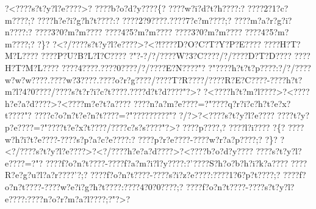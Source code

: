 \documentclass[11pt, openany]{book}
\begin{document}
{{{{{{{{{{{{{{{{{{{{{{{{{{{{{{{{{{{{{{{{{{{{{{{{{{{{{{{{{{{{{{{{{{{{{{{{{{{{{{{{{{{{{{{{{{{{{{{{{{{{{{{{{{{{{?\textless{}???\textbar{}?s?t?y?l?e???\textbar{}?\textgreater{}?
???\textbar{}?b?o?d?y???\textbar{}?\{?
???\textbar{}?w?i?d?t?h???\textbar{}?:?
???\textbar{}?2?1?c?m???\textbar{}?;?
???\textbar{}?h?e?i?g?h?t???\textbar{}?:?
???\textbar{}?2?9???\textbar{}?.???\textbar{}?7?c?m???\textbar{}?;?
???\textbar{}?m?a?r?g?i?n???\textbar{}?:?
???\textbar{}?3?0?m?m???\textbar{}? ???\textbar{}?4?5?m?m???\textbar{}?
???\textbar{}?3?0?m?m???\textbar{}?
???\textbar{}?4?5?m?m???\textbar{}?;? ?\}?
?\textless{}?/???\textbar{}?s?t?y?l?e???\textbar{}?\textgreater{}?\textless{}?!???\textbar{}?D?O?C?T?Y?P?E???\textbar{}?
???\textbar{}?H?T?M?L???\textbar{}?
???\textbar{}?P?U?B?L?I?C???\textbar{}?
?"?-?/?/???\textbar{}?W?3?C???\textbar{}?/?/???\textbar{}?D?T?D???\textbar{}?
???\textbar{}?H?T?M?L???\textbar{}?
???\textbar{}?4???\textbar{}?.???\textbar{}?0???\textbar{}?/?/???\textbar{}?E?N???\textbar{}?"?
?"???\textbar{}?h?t?t?p???\textbar{}?:?/?/???\textbar{}?w?w?w???\textbar{}?.???\textbar{}?w?3???\textbar{}?.???\textbar{}?o?r?g???\textbar{}?/???\textbar{}?T?R???\textbar{}?/???\textbar{}?R?E?C???\textbar{}?-???\textbar{}?h?t?m?l?4?0???\textbar{}?/???\textbar{}?s?t?r?i?c?t???\textbar{}?.???\textbar{}?d?t?d???\textbar{}?"?\textgreater{}?
?\textless{}???\textbar{}?h?t?m?l???\textbar{}?\textgreater{}?\textless{}???\textbar{}?h?e?a?d???\textbar{}?\textgreater{}?\textless{}???\textbar{}?m?e?t?a???\textbar{}?
???\textbar{}?n?a?m?e???\textbar{}?=?"???\textbar{}?q?r?i?c?h?t?e?x?t???\textbar{}?"?
???\textbar{}?c?o?n?t?e?n?t???\textbar{}?=?"???\textbar{}?????\textbar{}?"?
?/?\textgreater{}?\textless{}???\textbar{}?s?t?y?l?e???\textbar{}?
???\textbar{}?t?y?p?e???\textbar{}?=?"???\textbar{}?t?e?x?t???\textbar{}?/???\textbar{}?c?s?s???\textbar{}?"?\textgreater{}?
???\textbar{}?p???\textbar{}?,? ???\textbar{}?l?i???\textbar{}? ?\{?
???\textbar{}?w?h?i?t?e???\textbar{}?-???\textbar{}?s?p?a?c?e???\textbar{}?:?
???\textbar{}?p?r?e???\textbar{}?-???\textbar{}?w?r?a?p???\textbar{}?;?
?\}?
?\textless{}?/???\textbar{}?s?t?y?l?e???\textbar{}?\textgreater{}?\textless{}?/???\textbar{}?h?e?a?d???\textbar{}?\textgreater{}?\textless{}???\textbar{}?b?o?d?y???\textbar{}?
???\textbar{}?s?t?y?l?e???\textbar{}?=?"?
???\textbar{}?f?o?n?t???\textbar{}?-???\textbar{}?f?a?m?i?l?y???\textbar{}?:?'???\textbar{}?S?h?o?b?h?i?k?a???\textbar{}?
???\textbar{}?R?e?g?u?l?a?r???\textbar{}?'?;?
???\textbar{}?f?o?n?t???\textbar{}?-???\textbar{}?s?i?z?e???\textbar{}?:???\textbar{}?1?6?p?t???\textbar{}?;?
???\textbar{}?f?o?n?t???\textbar{}?-???\textbar{}?w?e?i?g?h?t???\textbar{}?:???\textbar{}?4?0?0???\textbar{}?;?
???\textbar{}?f?o?n?t???\textbar{}?-???\textbar{}?s?t?y?l?e???\textbar{}?:???\textbar{}?n?o?r?m?a?l???\textbar{}?;?"?\textgreater{}?
}}}}}}}}}}}}}}}}}}}}}}}}}}}}}}}}}}}}}}}}}}}}}}}}}}}}}}}}}}}}}}}}}}}}}}}}}}}}}}}}}}}}}}}}}}}}}}}}}}}}}}}}}}}}}
\end{document}
